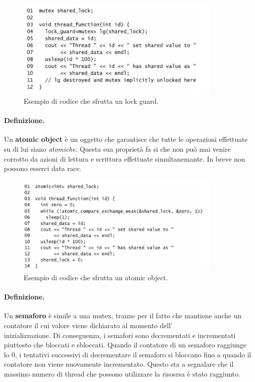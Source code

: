 \begin{figure}[H]
    \centering
    \includegraphics[width=10cm, keepaspectratio]{capitoli/secure_coding/img/cap_6/lockguard.png}
    \caption{Esempio di codice che sfrutta un lock guard.}
\end{figure}

\paragraph{Definizione.}
Un \textbf{atomic object} è un oggetto che garantisce che tutte le operazioni effettuate su di lui
siano \textit{atomiche}. Questa sua proprietà fa si che non può mai venire corrotto da azioni di
lettura e scrittura effettuate simultanemante. In breve non possono esserci data race.

\begin{figure}[H]
    \centering
    \includegraphics[width=10cm, keepaspectratio]{capitoli/secure_coding/img/cap_6/atomicobject.png}
    \caption{Esempio di codice che sfrutta un atomic object.}
\end{figure}

\paragraph{Definizione.}
Un \textbf{semaforo} è simile a una mutex, tranne per il fatto che
mantiene anche un contatore il cui valore viene dichiarato al momento dell'\\inizializzazione.
Di conseguenza, i semafori sono decrementati e incrementati piuttosto che bloccati e sbloccati.
Quando il contatore di un semaforo raggiunge lo 0, i tentativi successivi di decrementare
il semaforo si bloccano fino a quando il contatore non viene nuovamente incrementato.
Questo sta a segnalare che il massimo numero di thread che possono utilizzare la risosrsa è
stato raggiunto.\ \\


